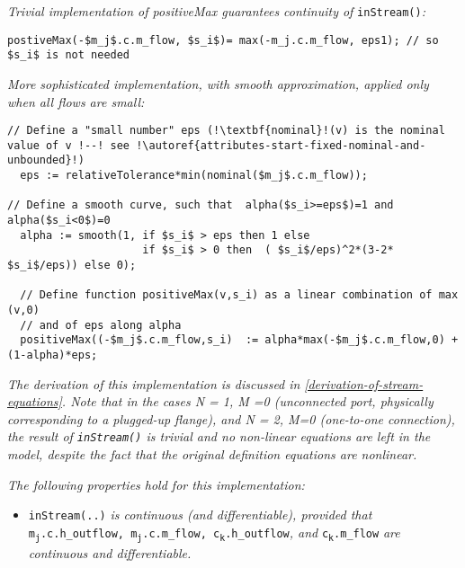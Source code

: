\emph{Trivial implementation of positiveMax guarantees continuity of}
\lstinline!inStream()!\emph{:}
\begin{lstlisting}[language=modelica,mathescape=true]
postiveMax(-$m_j$.c.m_flow, $s_i$)= max(-m_j.c.m_flow, eps1); // so $s_i$ is not needed
\end{lstlisting}
\emph{More sophisticated implementation, with smooth approximation,
applied only when {all} flows are small:}
\begin{lstlisting}[language=modelica,escapechar=!,mathescape=true]
// Define a "small number" eps (!\textbf{nominal}!(v) is the nominal value of v !--! see !\autoref{attributes-start-fixed-nominal-and-unbounded}!)
  eps := relativeTolerance*min(nominal($m_j$.c.m_flow));

// Define a smooth curve, such that  alpha($s_i>=eps$)=1 and alpha($s_i<0$)=0
  alpha := smooth(1, if $s_i$ > eps then 1 else
                     if $s_i$ > 0 then  ( $s_i$/eps)^2*(3-2* $s_i$/eps)) else 0);

  // Define function positiveMax(v,s_i) as a linear combination of max (v,0)
  // and of eps along alpha
  positiveMax((-$m_j$.c.m_flow,s_i)  := alpha*max(-$m_j$.c.m_flow,0) +  (1-alpha)*eps;
\end{lstlisting}

\emph{The derivation of this implementation is discussed in}
\emph{\autoref{derivation-of-stream-equations}. Note that in the cases N = 1, M =0 (unconnected port,
physically corresponding to a plugged-up flange), and N = 2, M=0
(one-to-one connection), the result of \lstinline!inStream()! is trivial
and no non-linear equations are left in the model, despite the fact that
the original definition equations are nonlinear.}

\emph{The following properties hold for this implementation:}

\begin{itemize}
\item
  \lstinline!inStream(..)! \emph{is continuous (and differentiable),
  provided that} \texttt{m\textsubscript{j}.c.h\_outflow,
  m\textsubscript{j}.c.m\_flow,
  c\textsubscript{k}.h\_outflow}\emph{, and}
  \texttt{c\textsubscript{k}.m\_flow} \emph{are continuous and differentiable.}
\end{itemize}

